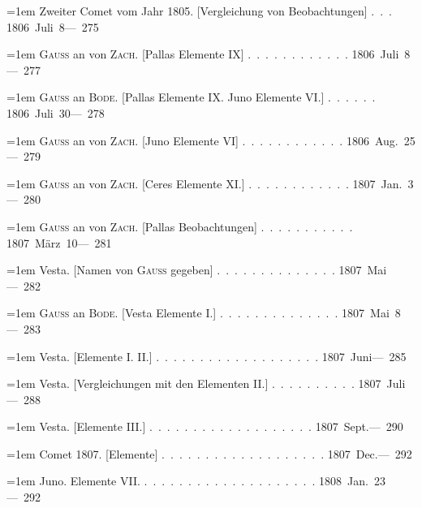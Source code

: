 \noindent\hangindent=1em Zweiter Comet vom Jahr 1805. [Vergleichung von Beobachtungen] \mbox{.\ .\ .} \hfill\mbox{1806 Juli 8}\quad\mbox{--- 275}\par\smallskip
\noindent\hangindent=1em \textsc{Gauss} an von \textsc{Zach}. [Pallas Elemente IX] \mbox{.\ .\ .\ .\ .\ .\ .\ .\ .\ .\ .\ .} \hfill\mbox{1806 Juli 8}\quad\mbox{--- 277}\par\smallskip
\noindent\hangindent=1em \textsc{Gauss} an \textsc{Bode}. [Pallas Elemente IX. Juno Elemente VI.] \mbox{.\ .\ .\ .\ .\ .} \hfill\mbox{1806 Juli 30}\quad\mbox{--- 278}\par\smallskip
\noindent\hangindent=1em \textsc{Gauss} an von \textsc{Zach}. [Juno Elemente VI] \mbox{.\ .\ .\ .\ .\ .\ .\ .\ .\ .\ .\ .} \hfill\mbox{1806 Aug. 25}\quad\mbox{--- 279}\par\smallskip
\noindent\hangindent=1em \textsc{Gauss} an von \textsc{Zach}. [Ceres Elemente XI.] \mbox{.\ .\ .\ .\ .\ .\ .\ .\ .\ .\ .\ .} \hfill\mbox{1807 Jan. 3}\quad\mbox{--- 280}\par\smallskip
\noindent\hangindent=1em \textsc{Gauss} an von \textsc{Zach}. [Pallas Beobachtungen] \mbox{.\ .\ .\ .\ .\ .\ .\ .\ .\ .\ .} \hfill\mbox{1807 März 10}\quad\mbox{--- 281}\par\smallskip
\noindent\hangindent=1em Vesta. [Namen von \textsc{Gauss} gegeben] \mbox{.\ .\ .\ .\ .\ .\ .\ .\ .\ .\ .\ .\ .\ .} \hfill\mbox{1807 Mai}\quad\mbox{--- 282}\par\smallskip
\noindent\hangindent=1em \textsc{Gauss} an \textsc{Bode}. [Vesta Elemente I.] \mbox{.\ .\ .\ .\ .\ .\ .\ .\ .\ .\ .\ .\ .\ .} \hfill\mbox{1807 Mai 8}\quad\mbox{--- 283}\par\smallskip
\noindent\hangindent=1em Vesta. [Elemente I. II.] \mbox{.\ .\ .\ .\ .\ .\ .\ .\ .\ .\ .\ .\ .\ .\ .\ .\ .\ .\ .} \hfill\mbox{1807 Juni}\quad\mbox{--- 285}\par\smallskip
\noindent\hangindent=1em Vesta. [Vergleichungen mit den Elementen II.] \mbox{.\ .\ .\ .\ .\ .\ .\ .\ .\ .} \hfill\mbox{1807 Juli}\quad\mbox{--- 288}\par\smallskip
\noindent\hangindent=1em Vesta. [Elemente III.] \mbox{.\ .\ .\ .\ .\ .\ .\ .\ .\ .\ .\ .\ .\ .\ .\ .\ .\ .\ .} \hfill\mbox{1807 Sept.}\quad\mbox{--- 290}\par\smallskip
\noindent\hangindent=1em Comet 1807. [Elemente] \mbox{.\ .\ .\ .\ .\ .\ .\ .\ .\ .\ .\ .\ .\ .\ .\ .\ .\ .\ .} \hfill\mbox{1807 Dec.}\quad\mbox{--- 292}\par\smallskip
\noindent\hangindent=1em Juno. Elemente VII. \mbox{.\ .\ .\ .\ .\ .\ .\ .\ .\ .\ .\ .\ .\ .\ .\ .\ .\ .\ .\ .} \hfill\mbox{1808 Jan. 23}\quad\mbox{--- 292}\par\smallskip

